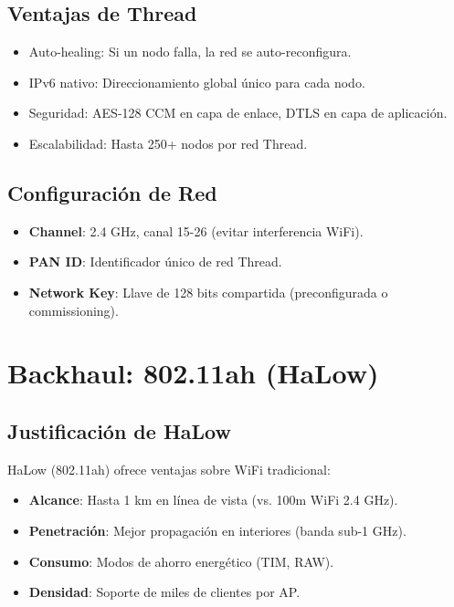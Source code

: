 \subsection{Ventajas de Thread}

\begin{itemize}
    \item Auto-healing: Si un nodo falla, la red se auto-reconfigura.
    \item IPv6 nativo: Direccionamiento global único para cada nodo.
    \item Seguridad: AES-128 CCM en capa de enlace, DTLS en capa de aplicación.
    \item Escalabilidad: Hasta 250+ nodos por red Thread.
\end{itemize}

\subsection{Configuración de Red}

\begin{itemize}
    \item \textbf{Channel}: 2.4 GHz, canal 15-26 (evitar interferencia WiFi).
    \item \textbf{PAN ID}: Identificador único de red Thread.
    \item \textbf{Network Key}: Llave de 128 bits compartida (preconfigurada o commissioning).
\end{itemize}

\section{Backhaul: 802.11ah (HaLow)}

\subsection{Justificación de HaLow}

HaLow (802.11ah) ofrece ventajas sobre WiFi tradicional:
\begin{itemize}
    \item \textbf{Alcance}: Hasta 1 km en línea de vista (vs. 100m WiFi 2.4 GHz).
    \item \textbf{Penetración}: Mejor propagación en interiores (banda sub-1 GHz).
    \item \textbf{Consumo}: Modos de ahorro energético (TIM, RAW).
    \item \textbf{Densidad}: Soporte de miles de clientes por AP.
\end{itemize}

